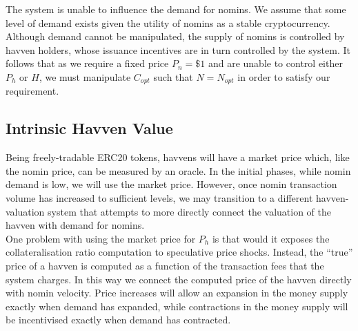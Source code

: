 \begin{center}
\end{center}

\noindent The system is unable to influence the demand for nomins. We assume that some level of demand exists given the utility of nomins as a stable cryptocurrency. Although demand cannot be manipulated, the supply of nomins is controlled by havven holders, whose issuance incentives are in turn controlled by the system. It follows that as we require a fixed price $P_n = \$1 $ and are unable to control either $P_h$ or $H$, we must manipulate $C_{opt}$ such that $N = N_{opt}$ in order to satisfy our requirement.

\subsection{Intrinsic Havven Value}

\noindent Being freely-tradable ERC20 tokens, havvens will have a market price which, like
the nomin price, can be measured by an oracle. In the initial phases, while nomin demand is low, 
we will use the market price. However, once nomin transaction volume has increased to sufficient
levels, we may transition to a different havven-valuation system that attempts to more directly
connect the valuation of the havven with demand for nomins. \\

\noindent One problem with using the market price for $P_h$ is that would it exposes the
collateralisation ratio computation to speculative price shocks.
Instead, the ``true'' price of a havven is computed as a function of the transaction
fees that the system charges. In this way we connect the computed price of the havven directly with
nomin velocity.
Price increases will allow an expansion in the money supply exactly when demand has expanded,
while contractions in the money supply will be incentivised exactly when demand has contracted. \\

